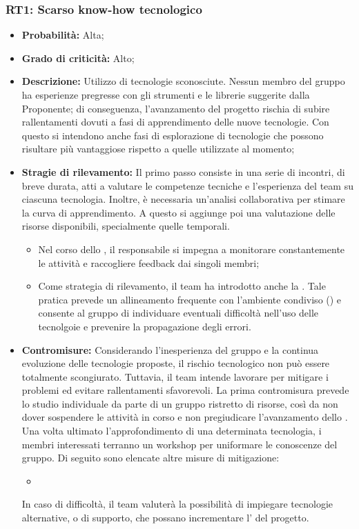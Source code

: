 \subsubsection{RT1: Scarso know-how tecnologico}
\begin{itemize}
    \item \textbf{Probabilità:} Alta;
    \item \textbf{Grado di criticità:} Alto;
    \item \textbf{Descrizione:} Utilizzo di tecnologie sconosciute. Nessun membro del gruppo ha
    esperienze pregresse con gli strumenti e le librerie suggerite dalla Proponente; di conseguenza, l’avanzamento del progetto rischia di subire rallentamenti dovuti a fasi di apprendimento delle nuove tecnologie.
    Con questo si intendono anche fasi di esplorazione di tecnologie che possono risultare più vantaggiose rispetto a quelle utilizzate al momento;
    \item \textbf{Stragie di rilevamento:} Il primo passo consiste in una serie di incontri, di breve durata, atti a valutare le competenze tecniche e l'esperienza del team su ciascuna tecnologia. Inoltre, è necessaria un'analisi collaborativa per stimare la curva di apprendimento. A questo si aggiunge poi una valutazione delle risorse disponibili, specialmente quelle temporali.
    \begin{itemize}
        \item Nel corso dello , il responsabile si impegna a monitorare constantemente le attività e raccogliere feedback dai singoli membri;
        \item Come strategia di rilevamento, il team ha introdotto anche la . Tale pratica prevede un allineamento frequente con l'ambiente condiviso () e consente al gruppo di individuare eventuali difficoltà nell'uso delle tecnolgoie e prevenire la propagazione degli errori. 
    \end{itemize}
    \item \textbf{Contromisure:} Considerando l'inesperienza del gruppo e la continua evoluzione delle tecnologie proposte, il rischio tecnologico non può essere totalmente scongiurato. Tuttavia, il team intende lavorare per mitigare i problemi ed evitare rallentamenti sfavorevoli. La prima contromisura prevede lo studio individuale da parte di un gruppo ristretto di risorse, così da non dover sospendere le attività in corso e non pregiudicare l'avanzamento dello . Una volta ultimato l'approfondimento di una determinata tecnologia, i membri interessati terranno un workshop per uniformare le conoscenze del gruppo. Di seguito sono elencate altre misure di mitigazione:
    \begin{itemize}
        \item 
    \end{itemize}
    \par In caso di difficoltà, il team valuterà la possibilità di impiegare tecnologie alternative, o di supporto, che possano incrementare l' del progetto.
\end{itemize}
